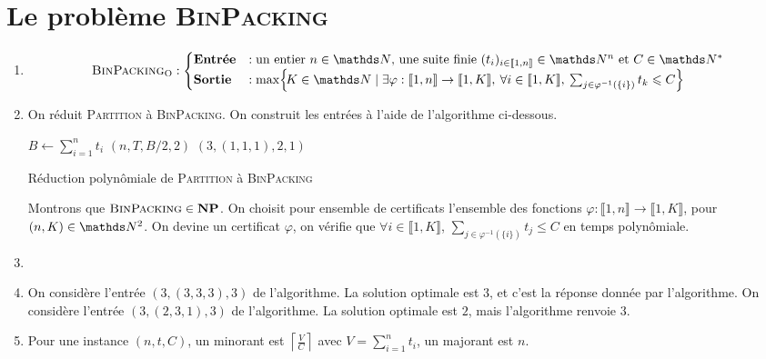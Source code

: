 \section{Le problème \textsc{BinPacking}}

\begin{enumerate}
	\item
		\[
			\textsc{BinPacking}_\mathrm{O} : \begin{cases}
				\text{\textbf{Entrée}} &: \text{un entier $n \in \N$, une suite finie $(t_i)_{i\in\llbracket 1,n \rrbracket} \in \N^n$\/ et $C \in \N^*$}\\
				\text{\textbf{Sortie}}&: \max\!\Big\{\!K \in \N  \mid \exists \varphi : \llbracket 1,n \rrbracket \to \llbracket 1,K \rrbracket,\: \forall i \in \llbracket 1,K \rrbracket,\: \sum_{j \in \varphi^{-1}(\{i\})}t_k \le C\Big\}
			\end{cases}
		\]
	\item On réduit \textsc{Partition} à \textsc{BinPacking}. On construit les entrées à l'aide de l'algorithme ci-dessous.
		\begin{algorithm}[H]
			\centering
			\begin{algorithmic}[1]
				\State $B \gets \sum_{i = 1}^n t_i$\/ 
				\State \Return $(n, T, B / 2, 2)$\/
				\Else
				\State \Return $(3, (1, 1, 1), 2, 1)$\/
				\EndIf
			\end{algorithmic}
			\caption{Réduction polynômiale de \textsc{Partition} à \textsc{BinPacking}}
		\end{algorithm}
		Montrons que $\textsc{BinPacking} \in \text{\textbf{NP}}$. On choisit pour ensemble de certificats l'ensemble des fonctions $\varphi : \llbracket 1,n \rrbracket \to \llbracket 1,K \rrbracket$, pour $(n,K) \in \N^2$. On devine un certificat $\varphi$, on vérifie que $\forall i \in \llbracket 1,K \rrbracket$, $\sum_{j \in \varphi^{-1}(\{i\})} t_j \le C$\/ en temps polynômiale.
	\item
	\item On considère l'entrée $(3, (3, 3, 3), 3)$ de l'algorithme. La solution optimale est $3$, et c'est la réponse donnée par l'algorithme.
		On considère l'entrée $(3, (2, 3, 1), 3)$\/ de l'algorithme. La solution optimale est $2$, mais l'algorithme renvoie $3$.
	\item Pour une instance $(n, t, C)$, un minorant est $\left\lceil \frac{V}{C} \right\rceil$ avec $V = \sum_{i = 1}^n t_i$, un majorant est $n$.
\end{enumerate}

